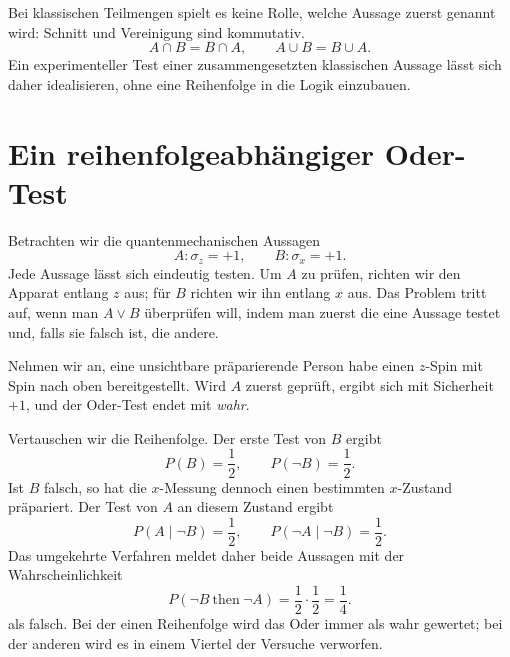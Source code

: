 \begin{classroomqa}
\end{classroomqa}

Bei klassischen Teilmengen spielt es keine Rolle, welche Aussage zuerst genannt wird: Schnitt und Vereinigung sind kommutativ.
\[
A\cap B=B\cap A,\qquad A\cup B=B\cup A.
\]
Ein experimenteller Test einer zusammengesetzten klassischen Aussage lässt sich daher idealisieren, ohne eine Reihenfolge in die Logik einzubauen.

\section{Ein reihenfolgeabhängiger Oder-Test}

Betrachten wir die quantenmechanischen Aussagen
\begin{equation}
A:\sigma_z=+1,\qquad B:\sigma_x=+1.
\end{equation}
Jede Aussage lässt sich eindeutig testen. Um \(A\) zu prüfen, richten wir den Apparat entlang \(z\) aus; für \(B\) richten wir ihn entlang \(x\) aus. Das Problem tritt auf, wenn man \(A\lor B\) überprüfen will, indem man zuerst die eine Aussage testet und, falls sie falsch ist, die andere.

Nehmen wir an, eine unsichtbare präparierende Person habe einen \(z\)-Spin mit Spin nach oben bereitgestellt. Wird \(A\) zuerst geprüft, ergibt sich mit Sicherheit \(+1\), und der Oder-Test endet mit \emph{wahr}.

Vertauschen wir die Reihenfolge. Der erste Test von \(B\) ergibt
\[
P(B)=\frac12,\qquad P(\neg B)=\frac12.
\]
Ist \(B\) falsch, so hat die \(x\)-Messung dennoch einen bestimmten \(x\)-Zustand präpariert. Der Test von \(A\) an diesem Zustand ergibt
\[
P(A\mid \neg B)=\frac12,\qquad
P(\neg A\mid \neg B)=\frac12.
\]
Das umgekehrte Verfahren meldet daher beide Aussagen mit der Wahrscheinlichkeit
\begin{equation}
P(\neg B\ \text{then}\ \neg A)
=\frac12\cdot\frac12=\frac14.
\end{equation}als falsch. Bei der einen Reihenfolge wird das Oder immer als wahr gewertet; bei der anderen wird es in einem Viertel der Versuche verworfen.

